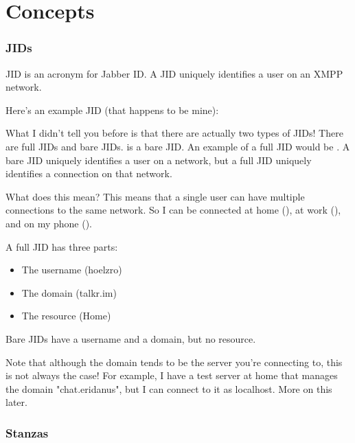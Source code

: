 \part{Concepts}

\newpage
\section*{JIDs}
\pause

JID is an acronym for Jabber ID.  A JID uniquely identifies a user on an XMPP network.

\pause

Here's an example JID (that happens to be mine): 

\pause

What I didn't tell you before is that there are actually two types of JIDs!  There are full JIDs
and bare JIDs.   is a bare JID.  An example of a full JID would be .
A bare JID uniquely identifies a user on a network, but a full JID uniquely identifies a connection on that
network.

\pause

What does this mean?  This means that a single user can have multiple connections to the same network.  So I can be
connected at home (), at work (), and on my phone ().

\pause

A full JID has three parts:
\pause

\begin{itemize}
\item The username (hoelzro)
\pause
\item The domain (talkr.im)
\pause
\item The resource (Home)
\end{itemize}
\pause

Bare JIDs have a username and a domain, but no resource.

\pause

Note that although the domain tends to be the server you're connecting to, this is not always the case!  For example, I have
a test server at home that manages the domain "chat.eridanus", but I can connect to it as localhost.  More on this later.

\newpage
\section*{Stanzas}
\pause

